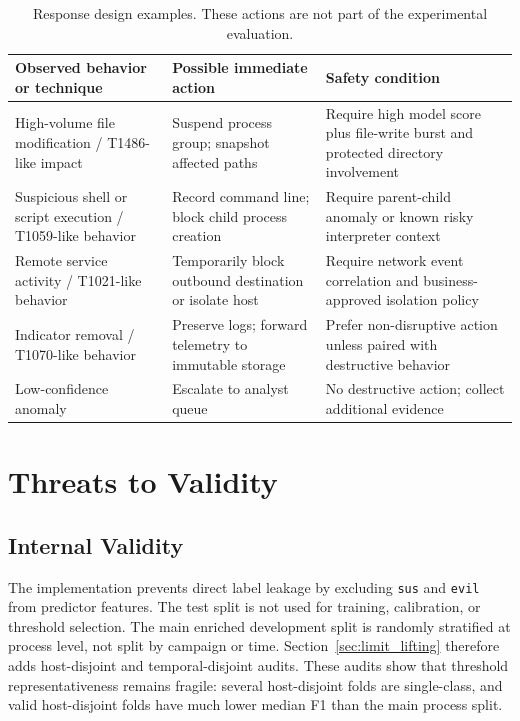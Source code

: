 \documentclass[journal]{IEEEtran}
\begin{document}
\begin{table}[t]
\centering
\caption{Response design examples. These actions are not part of the experimental evaluation.}
\label{tab:response}
\begin{tabular}{p{3.8cm}p{5.4cm}p{6.2cm}}
\toprule
\textbf{Observed behavior or technique} & \textbf{Possible immediate action} & \textbf{Safety condition} \\
\midrule
High-volume file modification / T1486-like impact & Suspend process group; snapshot affected paths & Require high model score plus file-write burst and protected directory involvement \\
Suspicious shell or script execution / T1059-like behavior & Record command line; block child process creation & Require parent-child anomaly or known risky interpreter context \\
Remote service activity / T1021-like behavior & Temporarily block outbound destination or isolate host & Require network event correlation and business-approved isolation policy \\
Indicator removal / T1070-like behavior & Preserve logs; forward telemetry to immutable storage & Prefer non-disruptive action unless paired with destructive behavior \\
Low-confidence anomaly & Escalate to analyst queue & No destructive action; collect additional evidence \\
\bottomrule
\end{tabular}
\end{table}

\section{Threats to Validity}
\label{sec:validity}

\subsection{Internal Validity}

The implementation prevents direct label leakage by excluding \texttt{sus} and \texttt{evil} from predictor features. The test split is not used for training, calibration, or threshold selection. The main enriched development split is randomly stratified at process level, not split by campaign or time. Section~\ref{sec:limit_lifting} therefore adds host-disjoint and temporal-disjoint audits. These audits show that threshold representativeness remains fragile: several host-disjoint folds are single-class, and valid host-disjoint folds have much lower median F1 than the main process split.
\end{document}
